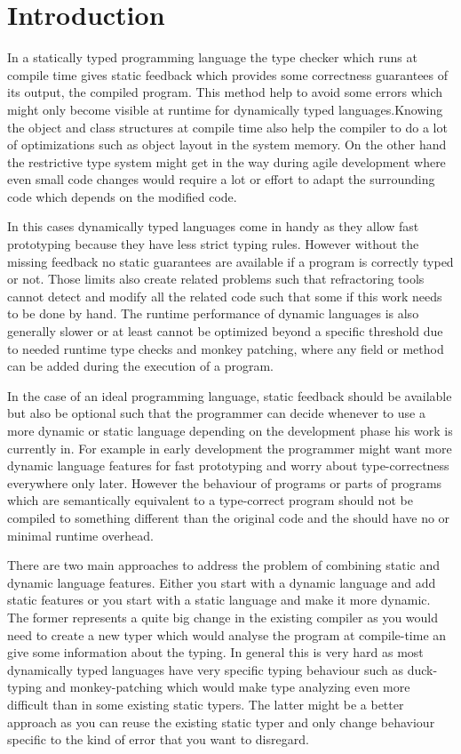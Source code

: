 \section{Introduction}

In a statically typed programming language the type checker which runs at
compile time gives static feedback which provides some correctness guarantees of
its output, the compiled program. This method help to avoid some errors which
might only become visible at runtime for dynamically typed languages.Knowing the
object and class structures at compile time also help the compiler to do a lot
of optimizations such as object layout in the system memory.
On the other hand the restrictive type system might get in the way during agile
development where even small code changes would require a lot or effort to adapt
the surrounding code which depends on the modified code.

In this cases dynamically typed languages come in handy as they allow fast
prototyping because they have less strict typing rules. However without the
missing feedback no static guarantees are available if a program is correctly
typed or not. Those limits also create related problems such that refractoring
tools cannot detect and modify all the related code such that some if this work
needs to be done by hand. The runtime performance of dynamic languages is also
generally slower or at least cannot be optimized beyond a specific threshold due
to needed runtime type checks and monkey patching, where any field or method can
be added during the execution of a program.

In the case of an ideal programming language, static feedback should be
available but also be optional such that the programmer can decide whenever to
use a more dynamic or static language depending on the development phase his
work is currently in. For example in early development the programmer might want
more dynamic language features for fast prototyping and worry about
type-correctness everywhere only later. However the behaviour of programs or
parts of programs which are semantically equivalent to a type-correct program
should not be compiled to something different than the original code and the
should have no or minimal runtime overhead.

There are two main approaches to address the problem of combining static and
dynamic language features. Either you start with a dynamic language and add
static features or you start with a static language and make it more dynamic.
The former represents a quite big change in the existing compiler as you would
need to create a new typer which would analyse the program at compile-time an
give some information about the typing. In general this is very hard as most
dynamically typed languages have very specific typing behaviour such as
duck-typing and monkey-patching which would make type analyzing even more
difficult than in some existing static typers. The latter might be a better
approach as you can reuse the existing static typer and only change behaviour
specific to the kind of error that you want to disregard.

